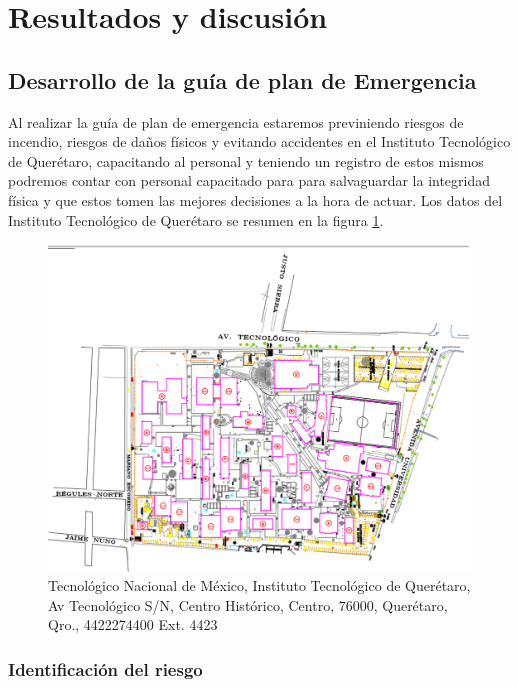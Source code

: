 \section{Resultados y discusión}

\subsection{Desarrollo de la guía de plan de Emergencia}

Al realizar la guía de plan de emergencia estaremos previniendo riesgos de incendio, riesgos de daños físicos y evitando accidentes en el Instituto Tecnológico de Querétaro, capacitando al personal y teniendo un registro de estos mismos podremos contar con personal capacitado para para salvaguardar la integridad física y que estos tomen las mejores decisiones a la hora de actuar.
Los datos del Instituto Tecnológico de Querétaro se resumen en la figura  \ref{fig:croquisTec}.
% 
% 
\begin{figure}[H]
    \centering
    \includegraphics[scale=0.3]{13/img/croquisTec.pdf}
    \caption{Tecnológico Nacional de México, Instituto Tecnológico de Querétaro, Av Tecnológico S/N, Centro Histórico, Centro, 76000, Querétaro, Qro., 4422274400 Ext. 4423}
    \label{fig:croquisTec}
\end{figure}
% 
% 
\subsubsection{Identificación del riesgo}

